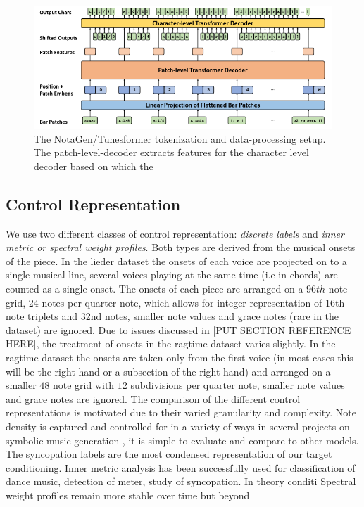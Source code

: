 \begin{figure}[H]
\centering
\includegraphics[width=1\textwidth]{IMAGES/NotaGenArchitecture.png} 
\caption{The NotaGen/Tunesformer tokenization and data-processing setup. The patch-level-decoder extracts features for the character level decoder based on which the }
\label{fig:notagenarch}
\end{figure}

\subsection{Control Representation}
We use two different classes of control representation: \textit{discrete labels} and \textit{inner metric or spectral weight profiles}. Both types are derived from the musical onsets of the piece. 
In the lieder dataset the onsets of each voice are projected on to a single musical line, several voices playing at the same time (i.e in chords) are counted as a single onset. The onsets of each piece are arranged on a $96th$ note grid, $24$ notes per quarter note, which allows for integer representation of 16th note triplets and 32nd notes, smaller note values and grace notes (rare in the dataset) are ignored. 
Due to issues discussed in [PUT SECTION REFERENCE HERE], the treatment of onsets in the ragtime dataset varies slightly.
In the ragtime dataset the onsets are taken only from the first voice (in most cases this will be the right hand or a subsection of the right hand) and arranged on a smaller $48$ note grid with $12$ subdivisions per quarter note, smaller note values and grace notes are ignored. 
The comparison of the different control representations is motivated due to their varied granularity and complexity. Note density is captured and controlled for in a variety of ways in several projects on symbolic music generation \cite{Tan_Herremans_2020} \cite{wu2023musemorphose} \cite{Min_Jiang_Xia_Zhao_polyffusion_2023} \cite{Rütte_figaro_2023}, it is simple to evaluate and compare to other models. 
The syncopation labels are the most condensed representation of our target conditioning. 
Inner metric analysis has been successfully used for classification of dance music, detection of meter, study of syncopation. In theory conditi
Spectral weight profiles remain more stable over time but beyond 




